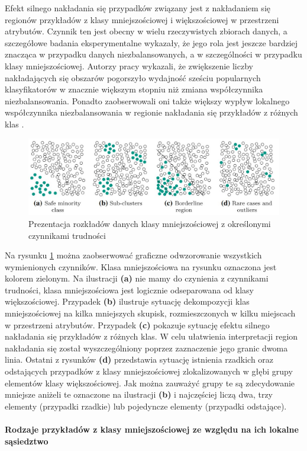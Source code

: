 \noindent Efekt silnego nakładania się przypadków związany jest z nakładaniem się regionów przykładów z klasy mniejszościowej i większościowej w przestrzeni atrybutów. Czynnik ten jest obecny w wielu rzeczywistych zbiorach danych, a szczegółowe badania eksperymentalne wykazały, że jego rola jest jeszcze bardziej znacząca w przypadku danych niezbalansowanych, a w szczególności w przypadku klasy mniejszościowej. Autorzy pracy \cite{Article:DataDistribution4} wykazali, że zwiększenie liczby nakładających się obszarów pogorszyło wydajność sześciu popularnych klasyfikatorów w znacznie większym stopniu niż zmiana współczynnika niezbalansowania. Ponadto zaobserwowali oni także większy wypływ lokalnego współczynnika niezbalansowania w regionie nakładania się przykładów z różnych klas \cite{Article:TypyPrzykladow}.

\begin{figure}[h] 
    \centering
    \includegraphics[width=15cm]{figures/data_examples.JPG}
    \caption{Prezentacja rozkładów danych klasy mniejszościowej z określonymi czynnikami trudności \cite{Article:TypyPrzykladow}}\label{Figure:TypesExample}
\end{figure}

\noindent Na rysunku \ref{Figure:TypesExample} można zaobserwować graficzne odwzorowanie wszystkich wymienionych czynników. Klasa mniejszościowa na rysunku oznaczona jest kolorem zielonym. Na ilustracji \textbf{(a)} nie mamy do czynienia z czynnikami trudności, klasa mniejszościowa jest logicznie odseparowana od klasy większościowej. Przypadek \textbf{(b)} ilustruje sytuację dekompozycji klas mniejszościowej na kilka mniejszych skupisk, rozmieszczonych w kilku miejscach w przestrzeni atrybutów. Przypadek \textbf{(c)} pokazuje sytuację efektu silnego nakładania się przykładów z różnych klas. W celu ułatwienia interpretacji region nakładania się został wyszczególniony poprzez zaznaczenie jego granic dwoma linia. Ostatni z rysunków \textbf{(d)} przedstawia sytuację istnienia rzadkich oraz odstających przypadków z klasy mniejszościowej zlokalizowanych w głębi grupy elementów klasy większościowej. Jak można zauważyć grupy te są zdecydowanie mniejsze aniżeli te oznaczone na ilustracji \textbf{(b)} i najczęściej liczą dwa, trzy elementy (przypadki rzadkie) lub pojedyncze elementy (przypadki odstające).\\\\
\textbf{Rodzaje przykładów z klasy mniejszościowej ze względu na ich lokalne sąsiedztwo}\\


